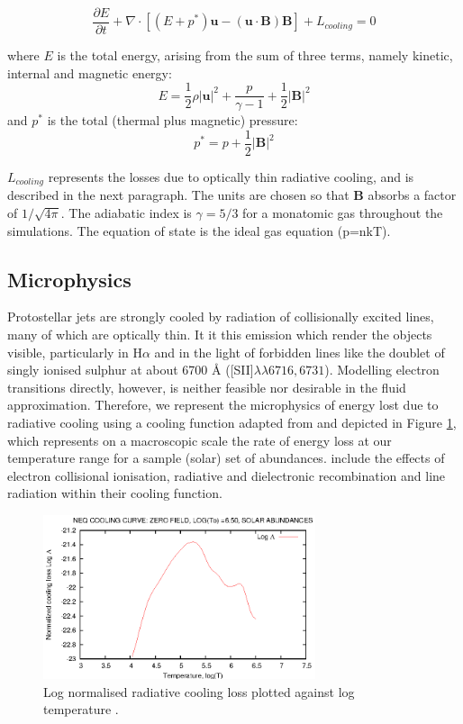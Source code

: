 \documentclass{aa}
\begin{document}
\begin{equation}
\frac{\partial E}{\partial t}
+\nabla
\cdot
\left[
\left( E + p^*\right) \mathbf{u}
- (\mathbf{u}\cdot\mathbf{B})\mathbf{B}
\right] + L_{cooling} = 0
\end{equation}

where $E$ is the total energy, 
arising from the sum of three terms, namely kinetic, 
internal and magnetic energy:
\begin{equation} 
E =
\frac{1}{2}\rho |\mathbf{u}|^2 + 
\frac{p}{\gamma-1}+
\frac{1}{2} |\mathbf{B}|^2
\end{equation}
and $p^*$ is the total (thermal plus magnetic) pressure:
\begin{equation} 
p^* = p + \frac{1}{2}|\mathbf{B}|^2
\end{equation}

$L_{cooling}$ represents the losses due to 
optically thin radiative cooling, 
and is described in the next paragraph.
The units are chosen so that $\mathbf B$ absorbs a factor of $1/\sqrt {4 \pi}$.
The adiabatic index is $\gamma = 5/3$ for a monatomic gas throughout the simulations.
The equation of state is the ideal gas equation (p=nkT).

\subsection{Microphysics}

Protostellar jets are strongly cooled by
radiation of collisionally excited lines,
many of which are optically thin.
It it this emission which render the objects visible, 
particularly in H$\alpha$ and in the light of forbidden 
lines like the doublet of singly ionised sulphur at about 6700 \AA
([SII]$\lambda\lambda6716,6731$).
Modelling electron transitions directly, however, 
is neither feasible nor desirable in the fluid approximation.
Therefore, we 
represent the microphysics of energy lost due to radiative cooling using a
cooling function adapted from \citet{1993ApJS...88..253S} and depicted 
in Figure
\ref{fig:4-33}, which represents on a macroscopic scale 
the rate of energy loss at our temperature range for a 
sample (solar) set of abundances.
\citet{1993ApJS...88..253S} include the effects of electron 
collisional ionisation, radiative and dielectronic 
recombination and line radiation within their cooling function.

\begin{figure}[ht]
\centering
\includegraphics[width=8cm]{8609fig2.eps}
\caption{
Log normalised radiative cooling loss plotted against log temperature \citep{1993ApJS...88..253S}.
}
\label{fig:4-33}\end{figure}
\end{document}
